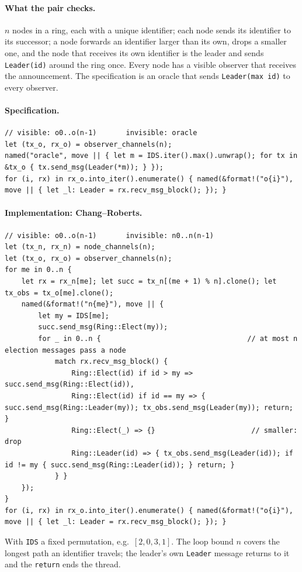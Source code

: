 \documentclass[11pt,a4paper]{article}
\newcommand{\code}[1]{\texttt{#1}}
\begin{document}
\paragraph{What the pair checks.} $n$ nodes in a ring, each with a unique identifier; each node
sends its identifier to its successor; a node forwards an identifier larger than its own, drops
a smaller one, and the node that receives its own identifier is the leader and sends
\code{Leader(id)} around the ring once. Every node has a visible observer that receives the
announcement. The specification is an oracle that sends \code{Leader(max id)} to every observer.

\paragraph{Specification.}
\begin{lstlisting}
// visible: o0..o(n-1)       invisible: oracle
let (tx_o, rx_o) = observer_channels(n);
named("oracle", move || { let m = IDS.iter().max().unwrap(); for tx in &tx_o { tx.send_msg(Leader(*m)); } });
for (i, rx) in rx_o.into_iter().enumerate() { named(&format!("o{i}"), move || { let _l: Leader = rx.recv_msg_block(); }); }
\end{lstlisting}

\paragraph{Implementation: Chang--Roberts.}
\begin{lstlisting}
// visible: o0..o(n-1)       invisible: n0..n(n-1)
let (tx_n, rx_n) = node_channels(n);
let (tx_o, rx_o) = observer_channels(n);
for me in 0..n {
    let rx = rx_n[me]; let succ = tx_n[(me + 1) % n].clone(); let tx_obs = tx_o[me].clone();
    named(&format!("n{me}"), move || {
        let my = IDS[me];
        succ.send_msg(Ring::Elect(my));
        for _ in 0..n {                                   // at most n election messages pass a node
            match rx.recv_msg_block() {
                Ring::Elect(id) if id > my => succ.send_msg(Ring::Elect(id)),
                Ring::Elect(id) if id == my => { succ.send_msg(Ring::Leader(my)); tx_obs.send_msg(Leader(my)); return; }
                Ring::Elect(_) => {}                       // smaller: drop
                Ring::Leader(id) => { tx_obs.send_msg(Leader(id)); if id != my { succ.send_msg(Ring::Leader(id)); } return; }
            } }
    });
}
for (i, rx) in rx_o.into_iter().enumerate() { named(&format!("o{i}"), move || { let _l: Leader = rx.recv_msg_block(); }); }
\end{lstlisting}
With \code{IDS} a fixed permutation, e.g.\ $[2, 0, 3, 1]$. The loop bound $n$ covers the
longest path an identifier travels; the leader's own \code{Leader} message returns to it and
the \code{return} ends the thread.
\end{document}
